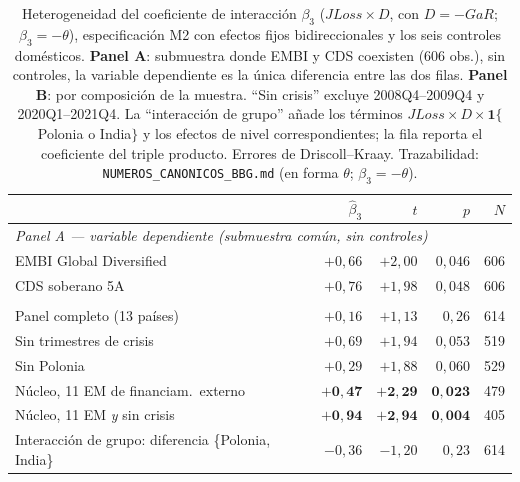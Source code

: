 \begin{table}[t]
\centering
\small
\setlength{\tabcolsep}{5pt}
\caption[Heterogeneidad del coeficiente de interacción $\beta_3$]{Heterogeneidad del coeficiente de interacción $\beta_3$ ($JLoss\times D$, con $D=-GaR$; $\beta_3=-\theta$), especificación M2 con efectos fijos bidireccionales y los seis controles domésticos. \textbf{Panel A}: submuestra donde EMBI y CDS coexisten (606 obs.), sin controles, la variable dependiente es la única diferencia entre las dos filas. \textbf{Panel B}: por composición de la muestra. ``Sin crisis'' excluye 2008Q4--2009Q4 y 2020Q1--2021Q4. La ``interacción de grupo'' añade los términos $JLoss\times D\times\mathbf{1}\{$Polonia o India$\}$ y los efectos de nivel correspondientes; la fila reporta el coeficiente del triple producto. Errores de Driscoll--Kraay. Trazabilidad: \texttt{NUMEROS\_CANONICOS\_BBG.md} (en forma $\theta$; $\beta_3=-\theta$).}
\label{tab:hetero}
\begin{tabular}{lrrrr}
\toprule
 & $\hat\beta_3$ & $t$ & $p$ & $N$ \\
\midrule
\multicolumn{5}{l}{\textit{Panel A --- variable dependiente (submuestra común, sin controles)}}\\
\quad EMBI Global Diversified & $+0{,}66$ & $+2{,}00$ & $0{,}046$ & 606 \\
\quad CDS soberano 5A         & $+0{,}76$ & $+1{,}98$ & $0{,}048$ & 606 \\
\addlinespace
\multicolumn{5}{l}{\textit{Panel B --- composición de la muestra}}\\
\quad Panel completo (13 países)               & $+0{,}16$ & $+1{,}13$ & $0{,}26$  & 614 \\
\quad Sin trimestres de crisis                 & $+0{,}69$ & $+1{,}94$ & $0{,}053$ & 519 \\
\quad Sin Polonia                              & $+0{,}29$ & $+1{,}88$ & $0{,}060$ & 529 \\
\quad Núcleo, 11 EM de financiam.\ externo & $\mathbf{+0{,}47}$ & $\mathbf{+2{,}29}$ & $\mathbf{0{,}023}$ & 479 \\
\quad Núcleo, 11 EM \emph{y} sin crisis & $\mathbf{+0{,}94}$ & $\mathbf{+2{,}94}$ & $\mathbf{0{,}004}$ & 405 \\
\quad Interacción de grupo: diferencia \{Polonia, India\} & $-0{,}36$ & $-1{,}20$ & $0{,}23$ & 614 \\
\bottomrule
\end{tabular}
\end{table}

